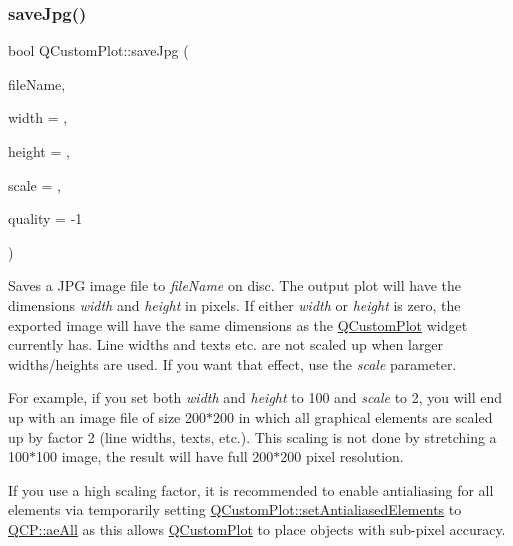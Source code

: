 \subsubsection{\texorpdfstring{save\+Jpg()}{saveJpg()}}
{\footnotesize\ttfamily bool Q\+Custom\+Plot\+::save\+Jpg (\begin{DoxyParamCaption}\item[{const Q\+String \&}]{file\+Name,  }\item[{int}]{width = {},  }\item[{int}]{height = {},  }\item[{double}]{scale = {},  }\item[{int}]{quality = {\ttfamily -\/1} }\end{DoxyParamCaption})}

Saves a J\+PG image file to {\itshape file\+Name} on disc. The output plot will have the dimensions {\itshape width} and {\itshape height} in pixels. If either {\itshape width} or {\itshape height} is zero, the exported image will have the same dimensions as the \mbox{\hyperlink{class_q_custom_plot}{Q\+Custom\+Plot}} widget currently has. Line widths and texts etc. are not scaled up when larger widths/heights are used. If you want that effect, use the {\itshape scale} parameter.

For example, if you set both {\itshape width} and {\itshape height} to 100 and {\itshape scale} to 2, you will end up with an image file of size 200$\ast$200 in which all graphical elements are scaled up by factor 2 (line widths, texts, etc.). This scaling is not done by stretching a 100$\ast$100 image, the result will have full 200$\ast$200 pixel resolution.

If you use a high scaling factor, it is recommended to enable antialiasing for all elements via temporarily setting \mbox{\hyperlink{class_q_custom_plot_af6f91e5eab1be85f67c556e98c3745e8}{Q\+Custom\+Plot\+::set\+Antialiased\+Elements}} to \mbox{\hyperlink{namespace_q_c_p_ae55dbe315d41fe80f29ba88100843a0caa897c232a0ffc8368e7c100ffc59ef31}{Q\+C\+P\+::ae\+All}} as this allows \mbox{\hyperlink{class_q_custom_plot}{Q\+Custom\+Plot}} to place objects with sub-\/pixel accuracy.

